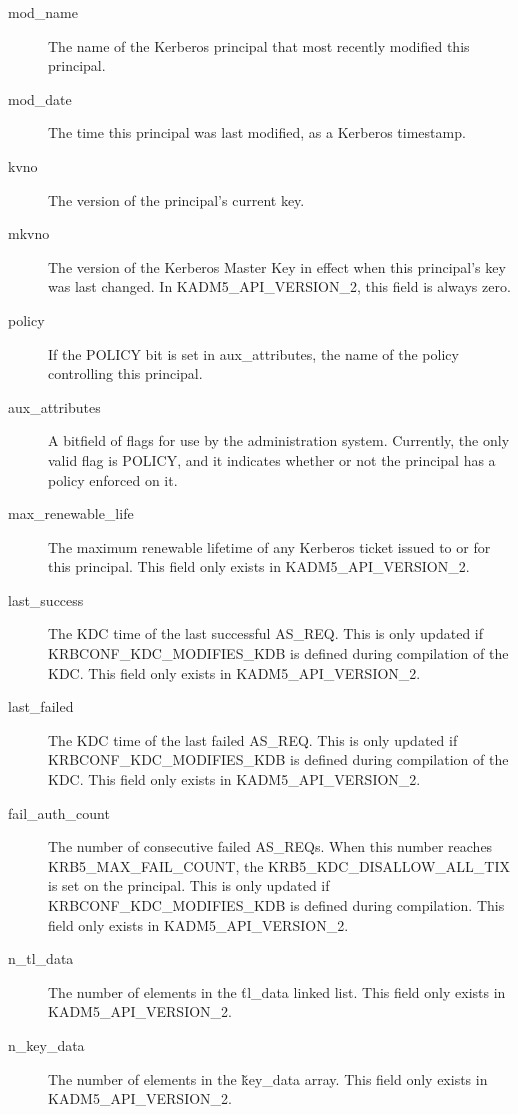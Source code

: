 \begin{description}
\item[mod_name] The name of the Kerberos principal that most recently
modified this principal.

\item[mod_date] The time this principal was last modified, as a Kerberos
timestamp.

\item[kvno] The version of the principal's current key.

\item[mkvno] The version of the Kerberos Master Key in effect when
this principal's key was last changed.  In KADM5_API_VERSION_2, this
field is always zero.

\item[policy] If the POLICY bit is set in aux_attributes, the name
of the policy controlling this principal.

\item[aux_attributes]  A bitfield of flags for use by the
administration system.  Currently, the only valid flag is POLICY, and
it indicates whether or not the principal has a policy enforced on it.

\item[max_renewable_life] The maximum renewable lifetime of any
Kerberos ticket issued to or for this principal.  This field only
exists in KADM5_API_VERSION_2.

\item[last_success] The KDC time of the last successful AS_REQ.  This
is only updated if KRBCONF_KDC_MODIFIES_KDB is defined during
compilation of the KDC.  This field only exists in
KADM5_API_VERSION_2.

\item[last_failed] The KDC time of the last failed AS_REQ.  This is
only updated if KRBCONF_KDC_MODIFIES_KDB is defined during compilation
of the KDC.  This field only exists in KADM5_API_VERSION_2.

\item[fail_auth_count] The number of consecutive failed AS_REQs.  When
this number reaches KRB5_MAX_FAIL_COUNT, the KRB5_KDC_DISALLOW_ALL_TIX
is set on the principal.  This is only updated if
KRBCONF_KDC_MODIFIES_KDB is defined during compilation.  This field
only exists in KADM5_API_VERSION_2.

\item[n_tl_data] The number of elements in the \v{tl_data} linked
list.  This field only exists in KADM5_API_VERSION_2.

\item[n_key_data] The number of elements in the \v{key_data}
array. This field only exists in KADM5_API_VERSION_2.


\end{description}
